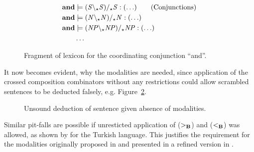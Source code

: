 \begin{figure}[ht]
\vspace{-1.5em}
\begin{align*}
  \mathbf{and}       &\models ({\mathit{S}} \backslash_\star {\mathit{S}}) /_\star {\mathit{S}}    : (\ldots)    \tag{Conjunctions} \\
  \mathbf{and}       &\models ({\mathit{N}} \backslash_\star {\mathit{N}}) /_\star {\mathit{N}}    : (\ldots)     \\
  \mathbf{and}       &\models ({\mathit{NP}} \backslash_\star {\mathit{NP}}) /_\star {\mathit{NP}} : (\ldots)  \\
  &\hdots 
\end{align*}
\vspace{-1.5em}
\caption{Fragment of lexicon for the coordinating conjunction ``and''.}
\label{fig:conjunctionLex}
\end{figure}

It now becomes evident, why the modalities are needed, since application of the crossed composition combinators without any restrictions could allow scrambled sentences to be deducted falsely, e.g. Figure~\ref{fig:withoutModalities}. 
\begin{figure}[ht]
\vspace{1em}
\center
{}
\caption{Unsound deduction of sentence given absence of modalities.}
\label{fig:withoutModalities}
\vspace{1em}
\end{figure}

Similar pit-falls are possible if unresticted application of ($>_{\bf B}$) and ($<_{\bf B}$) was allowed, as shown by \citeauthor{baldridgeThesis}  for the Turkish language. This justifies the requirement for the modalities \citeauthor{baldridgeThesis} originally proposed in  and \citeauthor{multiModalCCG} presented in a refined version in .


